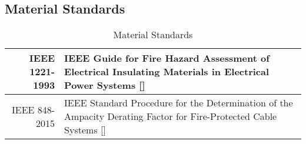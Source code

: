 \subsection{Material Standards}
\bgroup
\def\arraystretch{1.5}
\begin{table}[H]
\centering
\begin{tabular}{ | p{4cm} | p{12cm}| }
\hline
\multicolumn{1}{|r|}{IEEE 1221-1993} & IEEE Guide for Fire Hazard Assessment of Electrical Insulating Materials in Electrical Power Systems []\\ 
\hline
\multicolumn{1}{|r|}{IEEE 848-2015} & IEEE Standard Procedure for the Determination of the Ampacity Derating Factor for Fire-Protected Cable Systems []\\ 
\hline
\end{tabular}
\caption{Material Standards}
\end{table}	


%